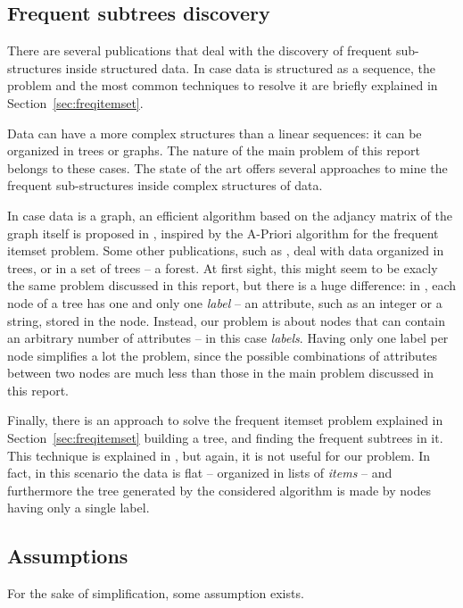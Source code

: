 \documentclass{acm_proc_article-sp-sigmod09}
\begin{document}
\subsection{Frequent subtrees discovery}
There are several publications that deal with the discovery of frequent sub-structures inside structured data. In case data is structured as a sequence, the problem and the most common techniques to resolve it are briefly explained in Section~\ref{sec:freqitemset}.

Data can have a more complex structures than a linear sequences: it can be organized in trees or graphs. The nature of the main problem of this report belongs to these cases. The state of the art offers several approaches to mine the frequent sub-structures inside complex structures of data.

In case data is a graph, an efficient algorithm based on the adjancy matrix of the graph itself is proposed in \cite{inokuchi2000apriori, kuramochi2001frequent}, inspired by the A-Priori algorithm for the frequent itemset problem. Some other publications, such as \cite{zaki2002efficiently}, deal with data organized in trees, or in a set of trees -- a forest. At first sight, this might seem to be exacly the same problem discussed in this report, but there is a huge difference: in \cite{zaki2002efficiently}, each node of a tree has one and only one \emph{label} -- an attribute, such as an integer or a string, stored in the node. Instead, our problem is about nodes that can contain an arbitrary number of attributes -- in this case \emph{labels}. Having only one label per node simplifies a lot the problem, since the possible combinations of attributes between two nodes are much less than those in the main problem discussed in this report.

Finally, there is an approach to solve the frequent itemset problem explained in Section~\ref{sec:freqitemset} building a tree, and finding the frequent subtrees in it. This technique is explained in \cite{han2004mining}, but again, it is not useful for our problem. In fact, in this scenario the data is flat -- organized in lists of \emph{items} -- and furthermore the tree generated by the considered algorithm is made by nodes having only a single label.

\subsection{Assumptions}
\label{sec:assumptions}
For the sake of simplification, some assumption exists.
\end{document}
